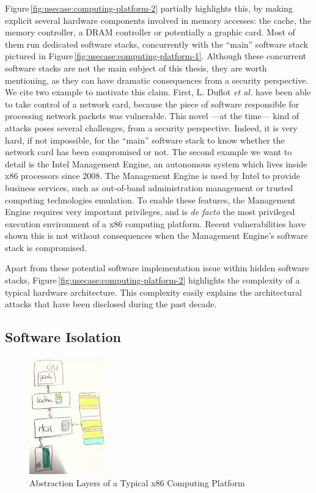Figure\,\ref{fig:usecase:computing-platform-2} partially highlights this, by
making explicit several hardware components involved in memory accesses: the
cache, the memory controller, a DRAM controller or potentially a graphic card.
%
Most of them run dedicated software stacks, concurrently with the ``main''
software stack pictured in Figure\,\ref{fig:usecase:computing-platform-1}.
%
Although these concurrent software stacks are not the main subject of this
thesis, they are worth mentioning, as they can have dramatic consequences from a
security perspective.
%
We cite two example to motivate this claim.
%
First, L. Duflot \emph{et al.} have been able to take control of a network card,
because the piece of software responsible for processing network packets was
vulnerable.
%
This novel ---at the time--- kind of attacks poses several challenges, from a
security perspective.
%
Indeed, it is very hard, if not impossible, for the ``main'' software stack to
know whether the network card has been compromised or not.
%
The second example we want to detail is the Intel Management Engine, an
autonomous system which lives inside x86 processors since 2008.
%
The Management Engine is used by Intel to provide business services, such as
out-of-band administration management or trusted computing technologies
emulation.
%
To enable these features, the Management Engine requires very important
privileges, and is \emph{de facto} the most privileged execution environment of
a x86 computing platform.
%
Recent vulnerabilities have shown this is not without consequences when the
Management Engine's software stack is compromised.

Apart from these potential software implementation issue within hidden software
stacks, Figure\,\ref{fig:usecase:computing-platform-2} highlights the complexity
of a typical hardware architecture.
%
This complexity easily explains the architectural attacks that have been
disclosed during the past decade.

\subsection{Software Isolation}

\begin{figure}
  \centering
  \includegraphics[width=0.3\textwidth]{Figures/computing-platform-3.jpg}
  \caption{Abstraction Layers of a Typical x86 Computing Platform}
  \label{fig:usecase:computing-platform-3}
\end{figure}

